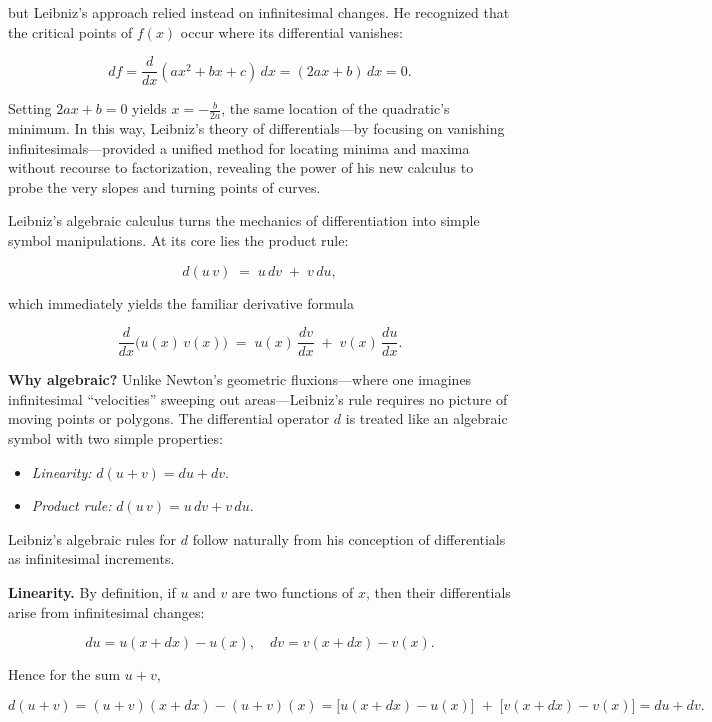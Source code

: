 but Leibniz’s approach relied instead on infinitesimal changes.  He recognized that the critical points of \(f(x)\) occur where its differential vanishes:

\[
df = \frac{d}{dx}(ax^2 + bx + c)\,dx = (2ax + b)\,dx = 0.
\]

Setting \(2ax + b = 0\) yields \(x = -\tfrac{b}{2a}\), the same location of the quadratic’s minimum.  In this way, Leibniz’s theory of differentials—by focusing on vanishing infinitesimals—provided a unified method for locating minima and maxima without recourse to factorization, revealing the power of his new calculus to probe the very slopes and turning points of curves.


Leibniz’s algebraic calculus turns the mechanics of differentiation into simple symbol manipulations.  At its core lies the product rule:

\[
d(u\,v)
\;=\;
u\,d v \;+\; v\,d u,
\]

which immediately yields the familiar derivative formula

\[
\frac{d}{dx}\bigl(u(x)\,v(x)\bigr)
\;=\;
u(x)\,\frac{dv}{dx} \;+\; v(x)\,\frac{du}{dx}.
\]

\bigskip

\textbf{Why algebraic?}  Unlike Newton’s geometric fluxions—where one imagines infinitesimal “velocities” sweeping out areas—Leibniz’s rule requires no picture of moving points or polygons.  The differential operator \(d\) is treated like an algebraic symbol with two simple properties:

\begin{itemize}
  \item \emph{Linearity:} \(d(u + v) = du + dv\).
  \item \emph{Product rule:} \(d(u\,v) = u\,dv + v\,du\).
\end{itemize}

Leibniz’s algebraic rules for \(d\) follow naturally from his conception of differentials as infinitesimal increments.


\textbf{Linearity.}  By definition, if \(u\) and \(v\) are two functions of \(x\), then their differentials arise from infinitesimal changes:

\[
du = u(x + dx) - u(x), 
\quad
dv = v(x + dx) - v(x).
\]

Hence for the sum \(u + v\),

\[
d(u+v)
= (u + v)(x + dx) - (u + v)(x)
= \bigl[u(x+dx) - u(x)\bigr] \;+\; \bigl[v(x+dx) - v(x)\bigr]
= du + dv.
\]

